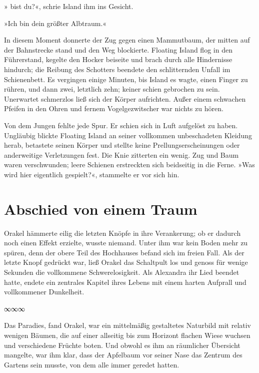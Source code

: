 » bist du?«, schrie Island ihm ins Gesicht.

»Ich bin dein größter Albtraum.«

In diesem Moment donnerte der Zug gegen einen Mammutbaum, der mitten auf der Bahnstrecke stand und den Weg blockierte. Floating Island flog in den Führerstand, kegelte den Hocker beiseite und brach durch alle Hindernisse hindurch; die Reibung des Schotters beendete den schlitternden Unfall im Schienenbett. Es vergingen einige Minuten, bis Island es wagte, einen Finger zu rühren, und dann zwei, letztlich zehn; keiner schien gebrochen zu sein. Unerwartet schmerzlos ließ sich der Körper aufrichten. Außer einem schwachen Pfeifen in den Ohren und fernem Vogelgezwitscher war nichts zu hören.

Von dem Jungen fehlte jede Spur. Er schien sich in Luft aufgelöst zu haben. Ungläubig blickte Floating Island an seiner vollkommen unbeschadeten Kleidung herab, betastete seinen Körper und stellte keine Prellungserscheinungen oder anderweitige Verletzungen fest. Die Knie zitterten ein wenig. Zug und Baum waren verschwunden; leere Schienen erstreckten sich beidseitig in die Ferne. »Was wird hier eigentlich gespielt?«, stammelte er vor sich hin.


\chapter{Abschied von einem Traum}


Orakel hämmerte eilig die letzten Knöpfe in ihre Verankerung; ob er dadurch noch einen Effekt erzielte, wusste niemand. Unter ihm war kein Boden mehr zu spüren, denn der obere Teil des Hochhauses befand sich im freien Fall. Als der letzte Knopf gedrückt war, ließ Orakel das Schaltpult los und genoss für wenige Sekunden die vollkommene Schwerelosigkeit. Als Alexandra ihr Lied beendet hatte, endete ein zentrales Kapitel ihres Lebens mit einem harten Aufprall und vollkommener Dunkelheit.

\begin{center}
∞∞∞
\end{center}

Das Paradies, fand Orakel, war ein mittelmäßig gestaltetes Naturbild mit relativ wenigen Bäumen, die auf einer allseitig bis zum Horizont flachen Wiese wuchsen und verschiedene Früchte boten. Und obwohl es ihm an räumlicher Übersicht mangelte, war ihm klar, dass der Apfelbaum vor seiner Nase das Zentrum des Gartens sein musste, von dem alle immer geredet hatten.


